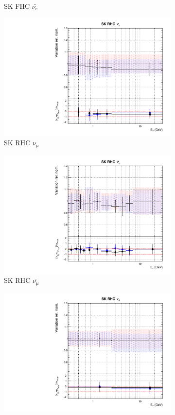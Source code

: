 \begin{figure}[t]
\begin{subfigure}{0.45\textwidth}
  \caption{SK FHC $\bar{\nu_e}$}
\end{subfigure}
\begin{subfigure}{0.45\textwidth}
  \centering
  \includegraphics[width=0.75\linewidth]{figs/rhcmpasmvflux12}
  \caption{SK RHC $\nu_{\mu}$}
\end{subfigure}
\begin{subfigure}{0.45\textwidth}
  \centering
  \includegraphics[width=0.75\linewidth]{figs/rhcmpasmvflux13}
  \caption{SK RHC $\bar{\nu_{\mu}}$}
\end{subfigure}
\begin{subfigure}{0.45\textwidth}
  \centering
  \includegraphics[width=0.75\linewidth]{figs/rhcmpasmvflux14}

\end{subfigure}
\end{figure}

